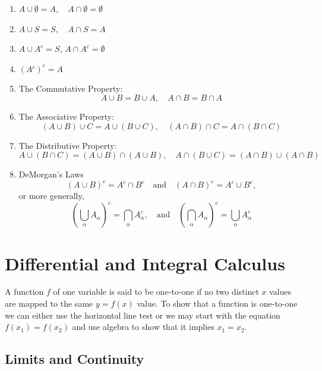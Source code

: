 \documentclass[captions=tableheading]{scrbook}
\begin{document}
\begin{enumerate}
\item \(A\cup\emptyset=A,\quad A\cap\emptyset=\emptyset\)
\item \(A\cup S=S,\quad A\cap S=A\)
\item \(A\cup A^{c}=S\), \(A\cap A^{c}=\emptyset\)
\item \((A{}^{c})^{c}=A\)
\item The Commutative Property: 
   \begin{equation}
   A \cup B = B\cup A,\quad A\cap B = B\cap A
   \end{equation}
\item The Associative Property: 
   \begin{equation}
   (A\cup B)\cup C=A\cup(B\cup C),\quad(A\cap B)\cap C=A\cap(B\cap C)
   \end{equation}
\item The Distributive Property: 
   \begin{equation}
   A\cup(B\cap C)=(A\cup B)\cap(A\cup B),\quad A\cap(B\cup C)=(A\cap B)\cup(A\cap B)
   \end{equation}
\item DeMorgan's Laws
   \begin{equation}
   (A\cup B)^{c}=A^{c}\cap B^{c}\quad\mbox{and}\quad(A\cap B)^{c}=A^{c}\cup B^{c},
   \end{equation}
   or more generally,
   \begin{equation}
   \left(\bigcup_{\alpha}A_{\alpha}\right)^{c}=\bigcap_{\alpha}A_{\alpha}^{c},\quad\mbox{and}\quad\left(\bigcap_{\alpha}A_{\alpha}\right)^{c}=\bigcup_{\alpha}A_{\alpha}^{c}
   \end{equation}
\end{enumerate}
\section{Differential and Integral Calculus \label{sec:Differential-and-Integral}}
\label{sec-21-2}


A function \(f\) of one variable is said to be one-to-one if no two distinct \(x\) values are mapped to the same \(y=f(x)\) value. To show that a function is one-to-one we can either use the horizontal line test or we may start with the equation \(f(x_{1}) = f(x_{2})\) and use algebra to show that it implies \(x_{1} = x_{2}\).
\subsection{Limits and Continuity}
\label{sec-21-2-1}
\end{document}
